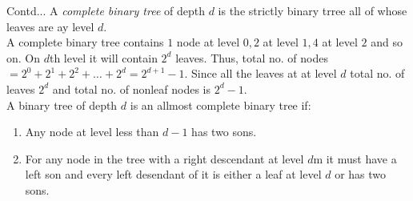 \documentclass[aspectratio=169,8pt]{beamer}
\begin{document}
\begin{frame}{Contd...}
  A \textit{complete binary tree} of depth $d$ is the strictly binary trree all
  of whose leaves are ay level $d$.\\
  \vspace*{0.2cm}
  A complete binary tree contains $1$ node at level $0, 2$ at level $1, 4$ at
  level $2$ and so on. On $d$th level it will contain $2^d$ leaves. Thus, total
  no. of nodes $= 2^0 + 2^1 + 2^2 + \ldots + 2^d = 2^{d + 1} - 1.$ Since all
  the leaves at at level $d$ total no. of leaves $2^d$ and total no. of nonleaf
  nodes is $2^{d} - 1$.\\
  \vspace*{0.2cm}
  A binary tree of depth $d$ is an allmost complete binary tree if:
  \begin{enumerate}
  \item Any node at level less than $d - 1$ has two sons.
  \item For any node in the tree with a right descendant at level $d$m it must
    have a left son and every left desendant of it is either a leaf at level
    $d$ or has two sons.
  \end{enumerate}
\end{frame}
\end{document}
